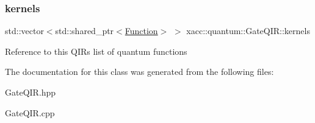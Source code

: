 \subsubsection{\texorpdfstring{kernels}{kernels}}
{\footnotesize\ttfamily std\+::vector$<$std\+::shared\+\_\+ptr$<$\hyperlink{a02456}{Function}$>$ $>$ xacc\+::quantum\+::\+Gate\+Q\+I\+R\+::kernels\hspace{0.3cm}{\ttfamily [protected]}}

Reference to this Q\+IR\textquotesingle{}s list of quantum functions 

The documentation for this class was generated from the following files\+:\begin{DoxyCompactItemize}
\item 
Gate\+Q\+I\+R.\+hpp\item 
Gate\+Q\+I\+R.\+cpp\end{DoxyCompactItemize}
